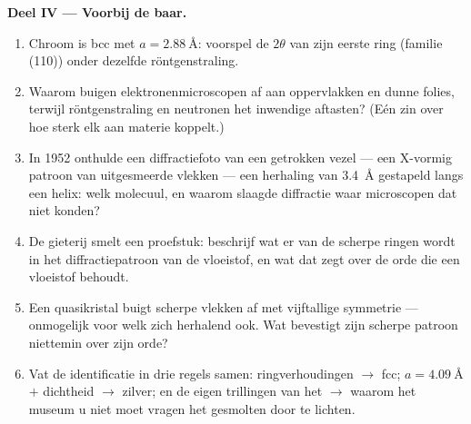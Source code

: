 \begin{problem}
\medskip\noindent\textbf{Deel IV --- Voorbij de baar.}

\begin{enumerate}[resume]
  \item Chroom is bcc met $a = \qty{2.88}{\angstrom}$: voorspel
        de $2\theta$ van zijn eerste ring (familie (110)) onder
        dezelfde röntgenstraling.
  \item Waarom buigen elektronenmicroscopen af aan oppervlakken en
        dunne folies, terwijl röntgenstraling en neutronen het inwendige aftasten? (Eén
        zin over hoe sterk elk aan materie koppelt.)
  \item In 1952 onthulde een diffractiefoto van een getrokken vezel --- een
        X-vormig patroon van uitgesmeerde vlekken --- een herhaling van
        \qty{3.4}{\angstrom} gestapeld langs een helix: welk molecuul,
        en waarom slaagde diffractie waar microscopen dat niet
        konden?
  \item De gieterij smelt een proefstuk: beschrijf wat er van de scherpe
        ringen wordt in het diffractiepatroon van de vloeistof, en wat
        dat zegt over de orde die een vloeistof behoudt.
  \item Een quasikristal buigt scherpe vlekken af met vijftallige
        symmetrie --- onmogelijk voor welk zich herhalend  ook. Wat
        bevestigt zijn scherpe patroon niettemin over zijn orde?
  \item Vat de identificatie in drie regels samen: ringverhoudingen
        $\to$ fcc; $a = \qty{4.09}{\angstrom}$ $+$ dichtheid $\to$
        zilver; en de eigen trillingen van het  $\to$ waarom het
        museum u niet moet vragen het gesmolten door te lichten.
\end{enumerate}
\end{problem}
